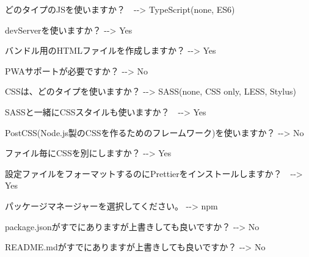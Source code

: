 \begin{starteritemize}
\item どのタイプのJSを使いますか？　{-}{-}\textgreater{} TypeScript(none, ES6)
\item devServerを使いますか？ {-}{-}\textgreater{} Yes
\item バンドル用のHTMLファイルを作成しますか？ {-}{-}\textgreater{} Yes
\item PWAサポートが必要ですか？ {-}{-}\textgreater{} No
\item CSSは、どのタイプを使いますか？ {-}{-}\textgreater{} SASS(none, CSS only, LESS, Stylus)
\item SASSと一緒にCSSスタイルも使いますか？　{-}{-}\textgreater{} Yes
\item PostCSS(Node.js製のCSSを作るためのフレームワーク)を使いますか？ {-}{-}\textgreater{} No
\item ファイル毎にCSSを別にしますか？ {-}{-}\textgreater{} Yes
\item 設定ファイルをフォーマットするのにPrettierをインストールしますか？　{-}{-}\textgreater{} Yes
\item パッケージマネージャーを選択してください。 {-}{-}\textgreater{} npm
\item package.jsonがすでにありますが上書きしても良いですか？ {-}{-}\textgreater{} No
\item README.mdがすでにありますが上書きしても良いですか？ {-}{-}\textgreater{} No
\end{starteritemize}

